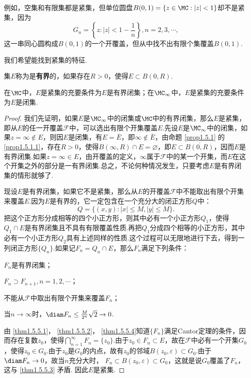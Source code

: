 例如，空集和有限集都是紧集，但单位圆盘$B(0,1)=\{z\in\MC:|z|<1\}$却不是紧集，因为
\[
  G_n = \left\{z:|z| < 1 - \frac1n\right\}, n = 2,3,\cdots,
\]
这一串同心圆构成$B(0,1)$的一个开覆盖，但从中找不出有限个集覆盖$B(0,1)$.

我们希望能找到紧集的特征.

集$E$称为是\textbf{有界}的，如果存在$R>0$，使得$E\subset B(0,R)$.
\begin{theorem}\label{thm1.5.5}
  在$\MC$中，$E$是紧集的充要条件为$E$是有界闭集；在$\MC_\infty$中，$E$是紧集的充要条件为$E$是闭集.
\end{theorem}
\begin{proof}
  我们先证明，如果$E$是$\MC_\infty$中的闭集或$\MC$中的有界闭集，那么$E$是紧集，即从$E$的任一开覆盖$\mathscr F$中，可以选出有限个开集覆盖$E$.先设$E$是$\MC_\infty$中的闭集，如果$z=\infty\notin E$，则因$E$是闭集，有$E=\bar E$，即$\infty\notin\bar E$，由命题 \ref{prop1.5.1} 的 \ref{prop1.5.1.1}，存在$R>0$，使得$B(\infty,R)\cap E=\varnothing$，即$E\subset\overline{B(0,R)}$，因而$E$是有界闭集.如果$z=\infty\in E$，由开覆盖的定义，$\infty$属于$\mathscr F$中的某一个开集，而$E$在这个开集之外的部分是一有界闭集.总之，不论何种情况发生，只要考虑$E$是有界闭集的情形就够了.

  现设$E$是有界闭集，如果它不是紧集，那么从$E$的开覆盖$\mathscr F$中不能取出有限个开集来覆盖$E$.因为$E$是有界的，它一定包含在一个充分大的闭正方形$Q$中：
  \[
    Q = \{(x,y): |x| \le M,|y| \le M\}.
  \]
  把这个正方形分成相等的四个小正方形，则其中必有一个小正方形$Q_1$，使得$Q_1\cap E$是有界闭集且不具有有限覆盖性质.再把$Q_1$分成四个相等的小正方形，其中必有一个小正方形$Q_2$具有上述同样的性质.这个过程可以无限地进行下去，得到一列闭正方形$\{Q_n\}$.如果记$F_n=Q_n\cap E$，那么$F_n$满足下列条件：
  \begin{eenum}
    \item  \label{thm1.5.5.1}$F_n$是有界闭集；
    \item  \label{thm1.5.5.2}$F_n\supset F_{n+1},n=1,2,\cdots$；
    \item  \label{thm1.5.5.3}不能从$\mathscr F$中取出有限个开集来覆盖$F_n$；
    \item  \label{thm1.5.5.4}当$n\to\infty$时，$\diam F_n\le\frac M{2^n}\sqrt2\to0$.
  \end{eenum}
  由 \ref{thm1.5.5.1}， \ref{thm1.5.5.2}， \ref{thm1.5.5.4}知道$\{F_n\}$满足Cantor定理的条件，因而存在复数$z_0$，使得$\bigcap_{n=1}^\infty F_n=\{z_0\}$.由于$z_0\in F_n\subset E$，故在$\mathscr F$中必有一个开集$G_0$，使得$z_0\in G_0$.由于$z_0$是$G_0$的内点，故有$z_0$的邻域$B(z_0,\varepsilon)\subset G_0$.由于$\diam F_n\to0$，故当$n$充分大时， $F_n\subset B(z_0,\varepsilon)\subset G_0$，这就是说$G_0$覆盖了$F_n$，这与 \ref{thm1.5.5.3} 矛盾. 因此$E$是紧集.


\end{proof}
